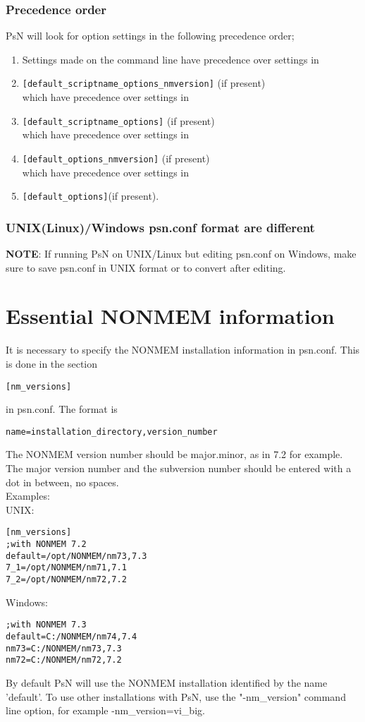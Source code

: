\subsubsection*{Precedence order}
PsN will look for option settings in the following precedence order;
\begin{enumerate}
\item Settings made on the command line have precedence over settings in
\item \verb|[default_scriptname_options_nmversion]| (if present)\\
which have precedence over settings in
\item \verb|[default_scriptname_options]| (if present)\\
which have precedence over settings in
\item \verb|[default_options_nmversion]| (if present)\\
which have precedence over settings in
\item \verb|[default_options]|(if present). 
\end{enumerate}
\subsubsection*{UNIX(Linux)/Windows psn.conf format are different}
\textbf{NOTE}: If running PsN on UNIX/Linux but editing psn.conf on Windows, make sure to save psn.conf in UNIX format or to convert after editing.
\newpage

\section{Essential NONMEM information}
It is necessary to specify the NONMEM installation information in psn.conf. This is done in the section
\begin{verbatim} 
[nm_versions]
\end{verbatim}
in psn.conf. The format is 
\begin{verbatim}
name=installation_directory,version_number
\end{verbatim}
The NONMEM version number should be major.minor, as in 7.2 for example.
The major version number and the subversion number should be entered with a dot in between, no spaces. \\
Examples:\\
UNIX:
\begin{verbatim}
[nm_versions]
;with NONMEM 7.2 
default=/opt/NONMEM/nm73,7.3
7_1=/opt/NONMEM/nm71,7.1
7_2=/opt/NONMEM/nm72,7.2
\end{verbatim}
Windows:
\begin{verbatim}
;with NONMEM 7.3
default=C:/NONMEM/nm74,7.4
nm73=C:/NONMEM/nm73,7.3
nm72=C:/NONMEM/nm72,7.2
\end{verbatim}
By default PsN will use the NONMEM installation identified by the name 'default'. To use other installations with PsN, use the "-nm\_version" command line option, for example -nm\_version=vi\_big.

